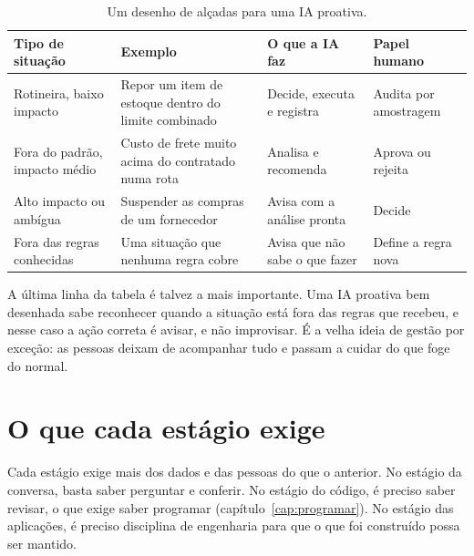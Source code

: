 \begin{table}[htbp]
  \centering
  \caption{Um desenho de alçadas para uma IA proativa.}
  \label{tab:decisoes-proativa}
  \small
  \begin{tabularx}{\textwidth}{@{}>{\raggedright\arraybackslash}p{}
      >{\raggedright\arraybackslash}X>{\raggedright\arraybackslash}p{}
      >{\raggedright\arraybackslash}p{}@{}}
    \toprule
    Tipo de situação & Exemplo & O que a IA faz & Papel humano \\
    \midrule
    Rotineira, baixo impacto & Repor um item de estoque dentro do limite combinado & Decide, executa e registra & Audita por amostragem \\
    \addlinespace
    Fora do padrão, impacto médio & Custo de frete muito acima do contratado numa rota & Analisa e recomenda & Aprova ou rejeita \\
    \addlinespace
    Alto impacto ou ambígua & Suspender as compras de um fornecedor & Avisa com a análise pronta & Decide \\
    \addlinespace
    Fora das regras conhecidas & Uma situação que nenhuma regra cobre & Avisa que não sabe o que fazer & Define a regra nova \\
    \bottomrule
  \end{tabularx}
\end{table}

A última linha da tabela é talvez a mais importante. Uma IA proativa bem desenhada sabe
reconhecer quando a situação está fora das regras que recebeu, e nesse caso a ação correta é
avisar, e não improvisar. É a velha ideia de gestão por exceção: as pessoas deixam de
acompanhar tudo e passam a cuidar do que foge do normal.


\section{O que cada estágio exige}
\label{sec:estagios-exigem}

Cada estágio exige mais dos dados e das pessoas do que o anterior. No estágio da conversa,
basta saber perguntar e conferir. No estágio do código, é preciso saber revisar, o que exige
saber programar (capítulo~\ref{cap:programar}). No estágio das aplicações, é preciso
disciplina de engenharia para que o que foi construído possa ser mantido.

